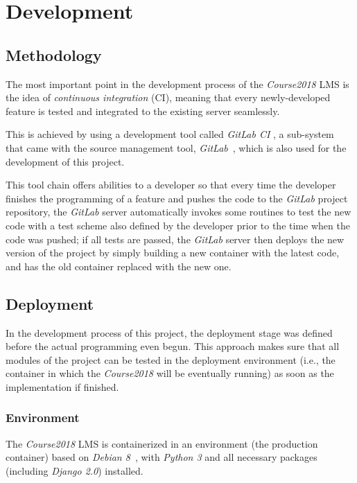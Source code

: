 

\chapter{Development}
\label{chap:DEV}

\section{Methodology}
The most important point in the development process of the \emph{Course2018}
LMS is the idea of \emph{continuous integration} (CI), meaning that every
newly-developed feature is tested and integrated to the existing server seamlessly.

\medskip
This is achieved by using a development tool called \emph{GitLab CI}
\cite{gitlabCI}, a sub-system that came with the source management tool,
\emph{GitLab}~\cite{gitlab}, which is also used for the development of this
project. 

\medskip

This tool chain offers abilities to a developer so that every time
the developer finishes the programming of a feature and pushes the code to the
\emph{GitLab} project repository, the \emph{GitLab} server automatically
invokes some
routines to test the new code with a test scheme also defined by the developer
prior to the time when the code was pushed; if all tests are passed, 
the \emph{GitLab} server then deploys the new version of the project by simply
building a new container with the latest code, and has the old
container replaced with the new one. 

\section{Deployment}
In the development process of this project, the deployment stage was defined
before the actual programming even begun. This approach makes sure that all
modules of the project can be tested in the
deployment environment (i.e., the container in which the \emph{Course2018}
will be eventually running) as soon as the implementation if finished.

\subsection{Environment}
The \emph{Course2018} LMS is containerized in an environment
(the production container) based on
\emph{Debian 8}~\cite{debian}, with \emph{Python 3} and all necessary packages
(including \emph{Django 2.0}) installed.

